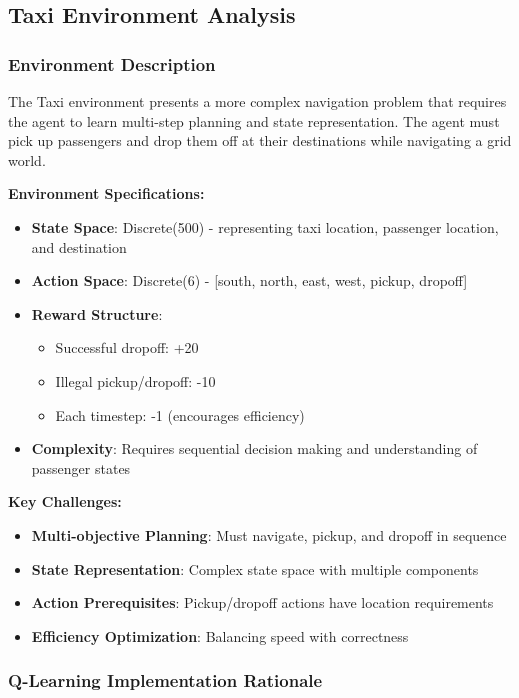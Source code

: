\documentclass[12pt]{article}
\begin{document}
{{{\subsection{Taxi Environment Analysis}

\subsubsection{Environment Description}

The Taxi environment presents a more complex navigation problem that requires the agent to learn multi-step planning and state representation. The agent must pick up passengers and drop them off at their destinations while navigating a grid world.

\textbf{Environment Specifications:}
\begin{itemize}
    \item \textbf{State Space}: Discrete(500) - representing taxi location, passenger location, and destination
    \item \textbf{Action Space}: Discrete(6) - [south, north, east, west, pickup, dropoff]
    \item \textbf{Reward Structure}:
        \begin{itemize}
            \item Successful dropoff: +20
            \item Illegal pickup/dropoff: -10
            \item Each timestep: -1 (encourages efficiency)
        \end{itemize}
    \item \textbf{Complexity}: Requires sequential decision making and understanding of passenger states
\end{itemize}

\textbf{Key Challenges:}
\begin{itemize}
    \item \textbf{Multi-objective Planning}: Must navigate, pickup, and dropoff in sequence
    \item \textbf{State Representation}: Complex state space with multiple components
    \item \textbf{Action Prerequisites}: Pickup/dropoff actions have location requirements
    \item \textbf{Efficiency Optimization}: Balancing speed with correctness
\end{itemize}

\subsubsection{Q-Learning Implementation Rationale}

}}}
\end{document}
